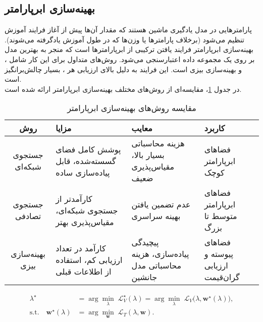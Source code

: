 \subsection{بهینه‌سازی ابرپارامتر}
 پارامترهایی در مدل یادگیری ماشین هستند که مقدار آن‌ها پیش از آغاز فرایند آموزش تنظیم می‌شود (برخلاف پارامترها یا وزن‌ها که در طول آموزش یادگرفته می‌شوند). بهینه‌سازی ابرپارامتر فرایند یافتن ترکیبی از ابرپارامترها است که منجر به بهترین  مدل بر روی یک مجموعه داده اعتبارسنجی می‌شود. روش‌های متداول برای این کار شامل ،  و بهینه‌سازی بیزی است. این فرایند به دلیل  بالای ارزیابی هر ، بسیار چالش‌برانگیز است.
\\
 در جدول \ref{tab:hpo-methods}، مقایسه‌ای از روش‌های مختلف بهینه‌سازی ابرپارامتر ارائه شده است.
\begin{table}[h!]
\centering
\caption{مقایسه روش‌های بهینه‌سازی ابرپارامتر}
\label{tab:hpo-methods}
\begin{tabular}{|c|p{4.5cm}|p{3.5cm}|p{3.5cm}|}
\hline
\textbf{روش} & \textbf{مزایا} & \textbf{معایب} & \textbf{کاربرد} \\
\hline
جستجوی شبکه‌ای & 
پوشش کامل فضای گسسته‌شده، قابل پیاده‌سازی ساده & 
هزینه محاسباتی بسیار بالا، مقیاس‌پذیری ضعیف & 
فضاهای ابرپارامتر کوچک \\
\hline
جستجوی تصادفی & 
کارآمدتر از جستجوی شبکه‌ای، مقیاس‌پذیری بهتر & 
عدم تضمین یافتن بهینه سراسری & 
فضاهای ابرپارامتر متوسط تا بزرگ \\
\hline
بهینه‌سازی بیزی & 
کارآمد در تعداد ارزیابی کم، استفاده از اطلاعات قبلی & 
پیچیدگی پیاده‌سازی، هزینه محاسباتی مدل جانشین & 
فضاهای پیوسته و ارزیابی گران‌قیمت \\
\hline
\end{tabular}
\end{table}
\begin{align}
    \lambda^\star                              & = \arg\min_{\lambda}\; \mathcal{L}_V^\star(\lambda)
    = \arg\min_{\lambda}\; \mathcal{L}_V\!\big(\lambda, \mathbf{w}^\star(\lambda)\big) \label{eq:hpo-outer},                        \\
    \text{s.t.}\quad \mathbf{w}^\star(\lambda) & = \arg\min_{\mathbf{w}}\; \mathcal{L}_T(\lambda, \mathbf{w}) \label{eq:hpo-inner}.
\end{align}

